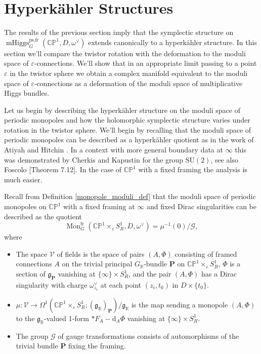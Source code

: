 \documentclass[11pt, oneside, reqno]{amsart}
\theoremstyle{definition} \newtheorem{definition}{Definition}[section]
\theoremstyle{definition} \newtheorem{remark}[definition]{Remark}
\theoremstyle{definition} \newtheorem{remarks}[definition]{Remarks}
\theoremstyle{definition} \newtheorem{question}[definition]{Question}
\theoremstyle{definition} \newtheorem*{note}{Note}
\theoremstyle{definition} \newtheorem{example}[definition]{Example}
\theoremstyle{definition} \newtheorem{examples}[definition]{Examples}
\renewcommand{\gg}{\mathfrak{g}}
\newcommand{\bb}[1]{\mathbb{#1}}
\newcommand{\mc}[1]{\mathcal{#1}}
\newcommand{\bo}[1]{\boldsymbol{#1}}
\newcommand{\RR}{\mathbb{R}}
\newcommand{\eps}{\varepsilon}
\newcommand{\SU}{\mathrm{SU}}
\DeclareMathOperator{\mhiggs}{mHiggs}
\DeclareMathOperator{\mon}{Mon}
\renewcommand{\d}{\mathrm{d}}
\newcommand{\fr}{\mathrm{fr}}
\begin{document}
\section{Hyperk\"ahler Structures} \label{hyperkahler_section}
The results of the previous section imply that the symplectic structure on $\mhiggs_G^{\text{ps,fr}}(\bb{CP}^1,D,\omega^\vee)$ extends canonically to a hyperk\"ahler structure.  In this section we'll compare the twistor rotation with the deformation to the moduli space of $\eps$-connections. We'll show that in an appropriate limit passing to a point $\eps$ in the twistor sphere we obtain a complex manifold equivalent to the moduli space of $\eps$-connections as a deformation of the moduli space of multiplicative Higgs bundles.

Let us begin by describing the hyperk\"ahler structure on the moduli space of periodic monopoles and how the holomorphic symplectic structure varies under rotation in the twistor sphere.  We'll begin by recalling that the moduli space of periodic monopoles can be described as a hyperk\"ahler quotient as in the work of Atiyah and Hitchin \cite{AtiyahHitchin}.  In a context with more general boundary data at $\infty$ this was demonstrated by Cherkis and Kapustin \cite{CherkisKapustin3} for the group $\SU(2)$, see also Foscolo \cite{FoscoloDef}[Theorem 7.12].  In the case of $\bb{CP}^1$ with a fixed framing the analysis is much easier.

Recall from Definition \ref{monopole_moduli_def} that the moduli space of periodic monopoles on $\bb{CP}^1$ with a fixed framing at $\infty$ and fixed Dirac singularities can be described as the quotient 
\[\mon_G^{\fr}(\bb{CP}^1 \times_\eps S^1_R, D, \omega^\vee) = \mu^{-1}(0)/\mc G,\]
where 
\begin{itemize}
\item The space $\mc V$ of fields is the space of pairs $(A,\Phi)$ consisting of framed connections $A$ on the trivial principal $G_\RR$-bundle $\bo P$ on $\bb{CP}^1 \times_\eps S^1_R$, $\Phi$ is a section of $\gg_{\bo P}$ vanishing at $\{\infty\} \times S^1_R$, and the pair $(A,\Phi)$ has a Dirac singularity with charge $\omega^\vee_{z_i}$ at each point $(z_i,t_0)$ in $D \times \{t_0\}$.
\item $\mu \colon \mc V \to \Omega^1(\bb{CP}^1 \times_\eps S^1_R; (\gg_\RR)_{\bo P})/\gg_\RR$ is the map sending a monopole $(A, \Phi)$ to the $\gg_\RR$-valued 1-form $\ast F_A - \d_A \Phi$ vanishing at $\{\infty\} \times S^1_R$.  
\item The group $\mc G$ of gauge transformations consists of automorphisms of the trivial bundle $\bo P$ fixing the framing.
\end{itemize}
\end{document}
